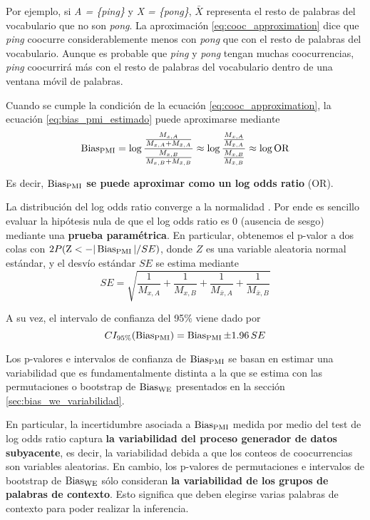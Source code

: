 Por ejemplo, si \emph{A = \{ping\}} y \emph{X = \{pong\}}, $\bar{X}$ representa el resto de palabras del vocabulario que no son \emph{pong}. La aproximación \ref{eq:cooc_approximation} dice que \emph{ping} coocurre considerablemente menos con \emph{pong} que con el resto de palabras del vocabulario. Aunque es probable que \emph{ping} y \emph{pong} tengan muchas coocurrencias, \emph{ping} coocurrirá más con el resto de palabras del vocabulario dentro de una ventana móvil de palabras. 

Cuando se cumple la condición de la ecuación \ref{eq:cooc_approximation}, la ecuación \ref{eq:bias_pmi_estimado} puede aproximarse mediante
%
\begin{equation} \label{eq:bias_pmi_estimado_logodds}
\operatorname{Bias_{PMI}}
    = \log \frac{
        \frac{M_{x,A}}{M_{x,A} + M_{\bar{x},A}}}{
        \frac{M_{x,B}}{M_{x,B} + M_{\bar{x},B}}}
    \approx \log \frac{
        \frac{M_{x,A}}{M_{\bar{x},A}}}{
        \frac{M_{x,B}}{M_{\bar{x},B}}}
    \approx \log \text{OR}
\end{equation}

Es decir, \textbf{$\operatorname{Bias_{PMI}}$ se puede aproximar como un log odds ratio} (OR).

La distribución del log odds ratio converge a la normalidad \citep{agresti2003categorical}. Por ende es sencillo evaluar la hipótesis nula de que el log odds ratio es 0 (ausencia de sesgo) mediante una \textbf{prueba paramétrica}. En particular, obtenemos el p-valor a dos colas con $2 P(\text{Z} < -|\operatorname{Bias_{PMI}}|/SE)$, donde $Z$ es una variable aleatoria normal estándar, y el desvío estándar $SE$ se estima mediante
%
\begin{equation} \label{eq:logodds_se}
    SE = \sqrt{
        \frac{1}{M_{x,A}}
        + \frac{1}{M_{x,B}}
        + \frac{1}{M_{\bar{x},A}}
        + \frac{1}{M_{\bar{x},B}}
    }
\end{equation}

A su vez, el intervalo de confianza del 95\% viene dado por
%
\begin{equation}
    CI_{95\%}(\operatorname{Bias_{PMI}}) 
        = 
        \operatorname{Bias_{PMI}} \pm 1.96 \, SE
\end{equation}

Los p-valores e intervalos de confianza de $\operatorname{Bias_{PMI}}$ se basan en estimar una variabilidad que es fundamentalmente distinta a la que se estima con las permutaciones o bootstrap de $\operatorname{Bias_{WE}}$ presentados en la sección \ref{sec:bias_we_variabilidad}. 

En particular, la incertidumbre asociada a $\operatorname{Bias_{PMI}}$ medida por medio del test de log odds ratio captura \textbf{la variabilidad del proceso generador de datos subyacente}, es decir, la variabilidad debida a que los conteos de coocurrencias son variables aleatorias. En cambio, los p-valores de permutaciones e intervalos de bootstrap de $\operatorname{Bias_{WE}}$ sólo consideran \textbf{la variabilidad de los grupos de palabras de contexto}. Esto significa que deben elegirse varias palabras de contexto para poder realizar la inferencia. 

